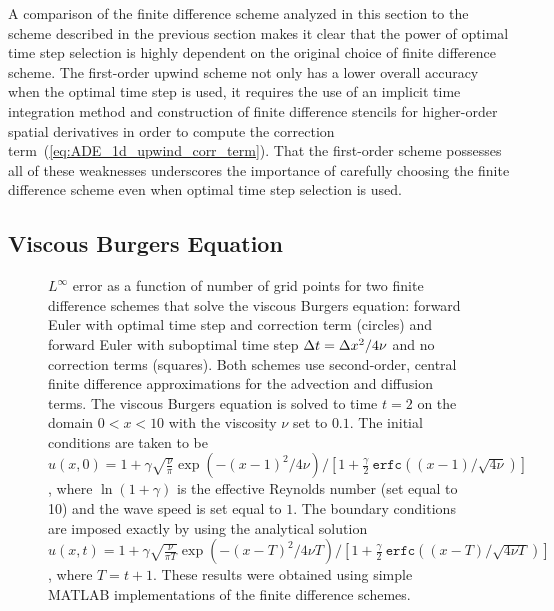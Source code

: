 \documentclass[oneeqnum,onefignum,onetabnum,onethmnum]{siamltex}
\begin{document}
A comparison of the finite difference scheme analyzed in this section to the 
scheme described in the previous section makes it clear that the power 
of optimal time step selection is highly dependent on the original choice of 
finite difference scheme.  The first-order upwind scheme not only has a 
lower overall accuracy when the optimal time step is used, it requires the 
use of an implicit time integration method and construction of finite 
difference stencils for higher-order spatial derivatives in order to compute
the correction term~(\ref{eq:ADE_1d_upwind_corr_term}).  That the first-order
scheme possesses all of these weaknesses underscores the importance of 
carefully choosing the finite difference scheme even when optimal time step 
selection is used.  


\subsection{Viscous Burgers Equation}
\begin{figure}[tb]
\begin{center}
\caption{$L^\infty$ error as a function of number of grid points for
two finite difference schemes that solve the viscous Burgers equation:
forward Euler with optimal time step and correction term (circles)
and forward Euler with suboptimal time step $\Delta t = \Delta x^2/4\nu$ and no 
correction terms (squares).
Both schemes use second-order, central finite difference approximations for
the advection and diffusion terms.
The viscous Burgers equation is solved to time $t=2$ on the domain 
$0 < x < 10$ with the viscosity $\nu$ set to $0.1$.  The initial conditions are 
taken to be 
$u(x,0) = 1 + \gamma \sqrt{\frac{\nu}{\pi}} \exp\left( -(x-1)^2/4 \nu \right) 
            / \left[ 1 + \frac{\gamma}{2} \ 
                         \mathtt{erfc}\left((x-1)/\sqrt{4\nu} \right) 
    \right]$,
where $\ln(1+\gamma)$ is the effective Reynolds number (set equal to 10) and 
the wave speed is set equal to $1$.  The boundary conditions are imposed 
exactly by using
the analytical solution
$u(x,t) = 1 + \gamma \sqrt{\frac{\nu}{\pi T}} 
              \exp\left( -(x-T)^2/4 \nu T \right) 
            / \left[ 1 + \frac{\gamma}{2} \ 
                         \mathtt{erfc}\left((x-T)/\sqrt{4\nu T} \right) 
    \right]$,
where $T = t+1$.
These results were obtained using simple MATLAB implementations of the 
finite difference schemes.
}
\label{fig:burgers_1d_error}
\end{center}
\end{figure}
\end{document}
